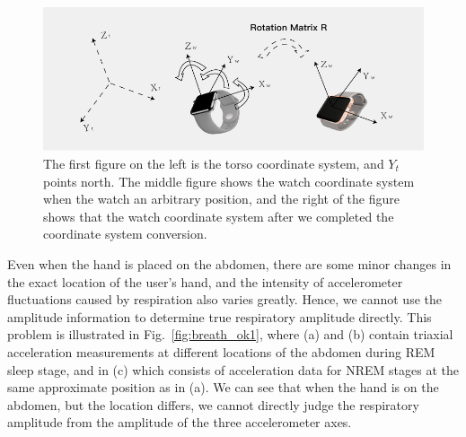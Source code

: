 \begin{figure}[!t]
\centering
      \includegraphics[width=0.67\linewidth]{Figures/watch.pdf}
  \caption{The first figure on the left is the torso coordinate system, and $Y_t$ points north. The middle figure shows the watch coordinate system when the watch an arbitrary position, and the right of the figure shows that the  watch coordinate system after we completed the coordinate system conversion.}\label{fig:watch}
\end{figure}

Even when the hand is placed on the abdomen, there are some minor changes in the exact location of the user's hand, and the intensity of accelerometer fluctuations caused by respiration also varies greatly. Hence, we cannot use the amplitude information to determine true respiratory amplitude directly. This problem is illustrated in Fig.~\ref{fig:breath_ok1}, where (a) and (b) contain triaxial acceleration measurements at different locations of the abdomen during REM sleep stage, and in (c) which consists of acceleration data for NREM stages at the same approximate position as in (a).  {We can see that when the hand is on the abdomen, but the location differs, we cannot directly judge the respiratory amplitude from the amplitude of the three accelerometer axes.}

